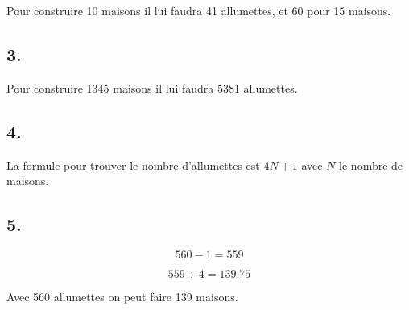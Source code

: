 \documentclass[12pt,a4paper]{article}
\begin{document}
Pour construire 10 maisons il lui faudra 41 allumettes, et 60 pour 15 maisons.

\subsection*{3.}

Pour construire \num{1345} maisons il lui faudra \num{5381} allumettes.

\subsection*{4.}

La formule pour trouver le nombre d'allumettes est $4N +1$ avec $N$ le nombre de maisons.


\subsection*{5.}

\begin{equation*}
	560 - 1 = 559
\end{equation*}

\begin{equation*}
559 \div 4 = \num{139.75}
\end{equation*}

Avec 560 allumettes on peut faire 139 maisons.

\end{document}

